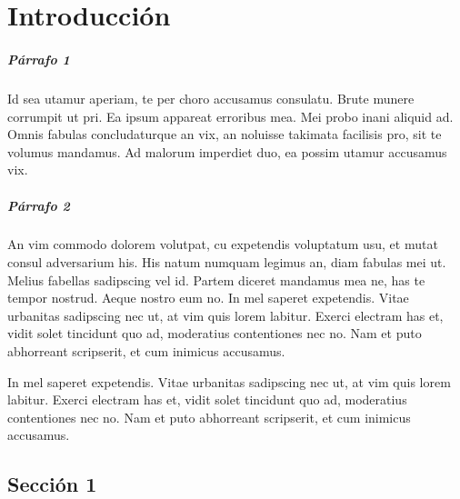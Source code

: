 \documentclass[11pt, letterpaper]{book} %
\begin{document}


\chapter{Introducción}

\paragraph{Párrafo 1}
Id sea utamur aperiam, te per choro accusamus consulatu. Brute munere corrumpit ut pri. Ea ipsum appareat erroribus mea. Mei probo inani aliquid ad. Omnis fabulas concludaturque an vix, an noluisse takimata facilisis pro, sit te volumus mandamus. Ad malorum imperdiet duo, ea possim utamur accusamus vix.

\paragraph{Párrafo 2}
\hspace{10mm}
An vim commodo dolorem volutpat, cu expetendis voluptatum usu, et mutat consul adversarium his. His natum numquam legimus an, diam fabulas mei ut. Melius fabellas sadipscing vel id. Partem diceret mandamus mea ne, has te tempor nostrud. Aeque nostro eum no. \newline
In mel saperet expetendis. Vitae urbanitas sadipscing nec ut, at vim quis lorem labitur. Exerci electram has et, vidit solet tincidunt quo ad, moderatius contentiones nec no. Nam et puto abhorreant scripserit, et cum inimicus accusamus. \linebreak

In mel saperet expetendis. Vitae urbanitas sadipscing nec ut, at vim quis lorem labitur. Exerci electram has et, vidit solet tincidunt quo ad, moderatius contentiones nec no. Nam et puto abhorreant scripserit, et cum inimicus accusamus.

\section{Sección 1}
\end{document}
